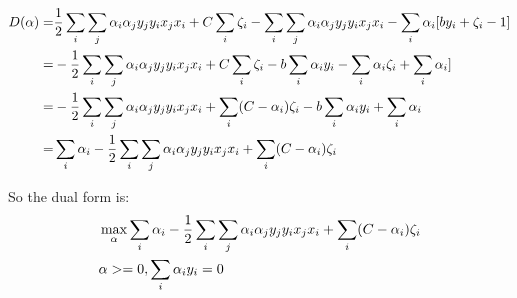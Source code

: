 \documentclass[12pt]{article}
\begin{document}
\begin{align}
    D(\alpha) =& \frac{1}{2}\sum_i\sum_j \alpha_i\alpha_j y_jy_i x_jx_i  + C\sum_i \zeta_i - \sum_i\sum_j \alpha_i\alpha_j y_jy_i x_jx_i 
    - \sum_i \alpha_i[by_i + \zeta_i -1] \notag \\
    =& -\frac{1}{2}\sum_i\sum_j \alpha_i\alpha_j y_jy_i x_jx_i+ C\sum_i \zeta_i - b\sum_i \alpha_iy_i - \sum_i \alpha_i\zeta_i + \sum_i \alpha_i]  \notag \\
    =& -\frac{1}{2}\sum_i\sum_j \alpha_i\alpha_j y_jy_i x_jx_i+ \sum_i (C -\alpha_i)\zeta_i - b\sum_i \alpha_iy_i + \sum_i \alpha_i \notag \\
    =& \sum_i \alpha_i -\frac{1}{2}\sum_i\sum_j \alpha_i\alpha_j y_jy_i x_jx_i+ \sum_i (C -\alpha_i)\zeta_i 
\end{align}

So the dual form is: 
\begin{align}
    &\max_\alpha \sum_i \alpha_i -\frac{1}{2}\sum_i\sum_j \alpha_i\alpha_j y_jy_i x_jx_i+ \sum_i (C -\alpha_i)\zeta_i  \notag \\
    &\alpha>=0, \sum_i \alpha_iy_i=0
\end{align}
\end{document}
